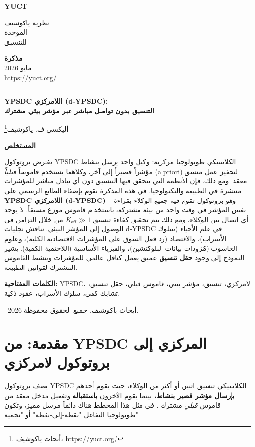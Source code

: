 \documentclass[11pt,a4paper]{article}
\newcommand{\makeheader}{%
	\noindent
	\begin{minipage}{0.17\textwidth}
		\raggedright
		{\sffamily\bfseries\color{skyblue}\fontsize{46}{46}\selectfont YUCT}%
	\end{minipage}%
	\hspace{30pt}
	\begin{minipage}{0.32\textwidth}
		\raggedright
		{\sffamily\fontsize{11}{13}\selectfont نظرية ياكوشيف\\ الموحدة\\ للتنسيق}%
	\end{minipage}%
	\hfill
	\begin{minipage}{0.38\textwidth}
		\raggedleft
		{\sffamily\bfseries مذكرة}\\
		{\sffamily مايو 2026}\\
		{\sffamily\footnotesize \url{https://yuct.org/}}%
	\end{minipage}
	\par\vspace{5pt}
	\noindent\textcolor{gold}{\rule{\textwidth}{1.6pt}}
	\par\vspace{0pt}
}
\begin{document}
	\renewcommand{\thepage}{\arabic{page}}
	\thispagestyle{firstpage}
	\makeheader
	
	\vspace{0cm}
	{\LARGE\bfseries YPSDC اللامركزي (d‑YPSDC): \\ التنسيق بدون تواصل مباشر عبر مؤشر بيئي مشترك \par}
	\vspace{0.2cm}
	
	{\large أليكسي ف. ياكوشيف\footnote{أبحاث ياكوشيف، \url{https://yuct.org/}}} \\
	\vspace{0.0cm}
	
	{\color{darkblue}\textbf{\LARGE المستخلص}} \par
	{\large
		\noindent
		يفترض بروتوكول YPSDC الكلاسيكي طوبولوجيا مركزية: وكيل واحد يرسل بنشاط مؤشراً قصيراً إلى آخر، وكلاهما يستخدم قاموساً \emph{قبلياً} (a priori) لتحفيز عمل منسق معقد. ومع ذلك، فإن الأنظمة التي يتحقق فيها التنسيق دون أي تبادل مباشر للمؤشرات منتشرة في الطبيعة والتكنولوجيا. في هذه المذكرة نقوم بإضفاء الطابع الرسمي على \textbf{YPSDC اللامركزي (d‑YPSDC)} – وهو بروتوكول تقوم فيه جميع الوكلاء بقراءة نفس المؤشر في وقت واحد من بيئة مشتركة، باستخدام قاموس موزع مسبقاً. لا يوجد أي اتصال بين الوكلاء، ومع ذلك يتم تحقيق كفاءة تنسيق \(K_{\mathrm{eff}} \gg 1\) من خلال التزامن في الوصول إلى المؤشر البيئي. نناقش تجليات d‑YPSDC في علم الأحياء (سلوك الأسراب)، والاقتصاد (رد فعل السوق على المؤشرات الاقتصادية الكلية)، وعلوم الحاسوب (مُزودات بيانات البلوكتشين)، والفيزياء الأساسية (اللاحتمية الكمية). يشير النموذج إلى وجود \textbf{حقل تنسيق} عميق يعمل كناقل عالمي للمؤشرات وينشط القاموس المشترك لقوانين الطبيعة.
	}
	
	\vspace{0.1cm}
	\noindent
	{\color{darkblue}\textbf{الكلمات المفتاحية:}} YPSDC، لامركزي، تنسيق، مؤشر بيئي، قاموس قبلي، حقل تنسيق، تشابك كمي، سلوك الأسراب، عقود ذكية.
	
	\vspace{0.5cm}
	\noindent
	\textcopyright\ 2026 أبحاث ياكوشيف. جميع الحقوق محفوظة.
	
	\tableofcontents
	\newpage
	
	\section{مقدمة: من YPSDC المركزي إلى بروتوكول لامركزي}
	
	يصف بروتوكول YPSDC الكلاسيكي تنسيق اثنين أو أكثر من الوكلاء، حيث يقوم أحدهم \textbf{بإرسال مؤشر قصير بنشاط}، بينما يقوم الآخرون \textbf{باستقباله} وتفعيل مدخل معقد من قاموس \emph{قبلي} مشترك \cite{YUCT}. في مثل هذا المخطط هناك دائماً مرسل مميز، وتكون طوبولوجيا التفاعل "نقطة‑إلى‑نقطة" أو "نجمية".
	
\end{document}
